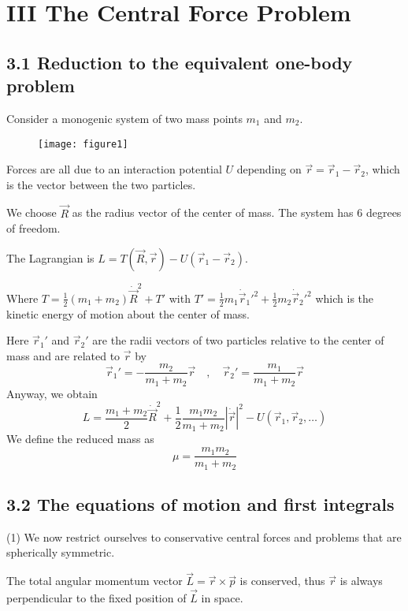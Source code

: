 \documentclass{article}
\begin{document}
	
	\section*{III The Central Force Problem}
	
	\subsection*{3.1 Reduction to the equivalent one-body problem}
	
	Consider a monogenic system of two mass points $m_1$ and $m_2$.

    \begin{figure}[h]
      	\centering
    	\texttt{[image: figure1]}
    	\caption{}
    	\label{fig:figure1}
    \end{figure}
	
	Forces are all due to an interaction potential $U$ depending on $\vec{r} = \vec{r}_1 - \vec{r}_2$, which is the vector between the two particles.
	
	We choose $\vec{R}$ as the radius vector of the center of mass. The system has 6 degrees of freedom.
	
	The Lagrangian is $L = T(\vec{R}, \vec{r}) - U(\vec{r}_1 - \vec{r}_2)$.
	
	Where $T = \frac{1}{2}(m_1+m_2)\dot{\vec{R}}^2 + T'$ with $T' = \frac{1}{2}m_1\dot{\vec{r}}_1'^2 + \frac{1}{2}m_2\dot{\vec{r}}_2'^2$ which is the kinetic energy of motion about the center of mass.
	
	Here $\vec{r}_1'$ and $\vec{r}_2'$ are the radii vectors of two particles relative to the center of mass and are related to $\vec{r}$ by
	$$ \vec{r}_1' = -\frac{m_2}{m_1+m_2}\vec{r} \quad, \quad \vec{r}_2' = \frac{m_1}{m_1+m_2}\vec{r} $$
	Anyway, we obtain
	$$ L = \frac{m_1+m_2}{2}\dot{\vec{R}}^2 + \frac{1}{2}\frac{m_1m_2}{m_1+m_2}|\dot{\vec{r}}|^2 - U(\vec{r}_1, \vec{r}_2, \dots) $$
	We define the reduced mass as
	$$ \mu = \frac{m_1m_2}{m_1+m_2} $$
	
	\subsection*{3.2 The equations of motion and first integrals}
	
	(1) We now restrict ourselves to conservative central forces and problems that are spherically symmetric.
	
	The total angular momentum vector $\vec{L} = \vec{r} \times \vec{p}$ is conserved, thus $\vec{r}$ is always perpendicular to the fixed position of $\vec{L}$ in space.
	
\end{document}
